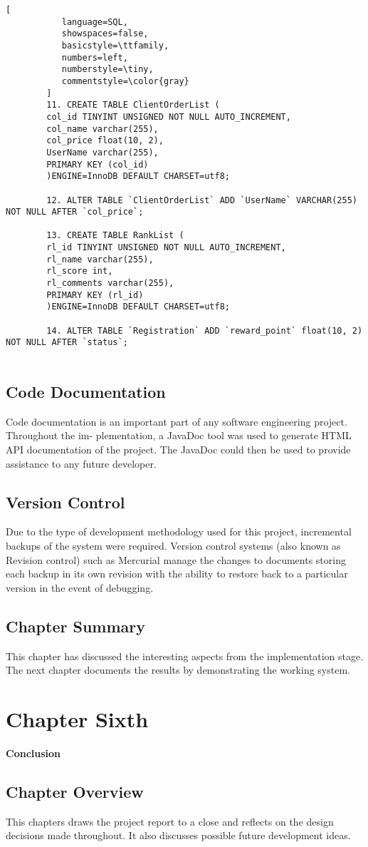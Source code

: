 \documentclass[12pt,a4paper]{article}
\begin{document}
\begin{lstlisting}[
           language=SQL,
           showspaces=false,
           basicstyle=\ttfamily,
           numbers=left,
           numberstyle=\tiny,
           commentstyle=\color{gray}
        ]
	 	11. CREATE TABLE ClientOrderList (
		col_id TINYINT UNSIGNED NOT NULL AUTO_INCREMENT,
		col_name varchar(255),
		col_price float(10, 2),
		UserName varchar(255),
		PRIMARY KEY (col_id)
		)ENGINE=InnoDB DEFAULT CHARSET=utf8;

	 	12. ALTER TABLE `ClientOrderList` ADD `UserName` VARCHAR(255) NOT NULL AFTER `col_price`;

	 	13. CREATE TABLE RankList (
		rl_id TINYINT UNSIGNED NOT NULL AUTO_INCREMENT,
		rl_name varchar(255),
		rl_score int,
		rl_comments varchar(255),
		PRIMARY KEY (rl_id)
		)ENGINE=InnoDB DEFAULT CHARSET=utf8;
		
	 	14. ALTER TABLE `Registration` ADD `reward_point` float(10, 2) NOT NULL AFTER `status`;
		
\end{lstlisting}
	
	\subsection{Code Documentation}
	Code documentation is an important part of any software engineering project. Throughout the im-
plementation, a JavaDoc tool was used to generate HTML API documentation of the project. The
JavaDoc could then be used to provide assistance to any future developer.

	\subsection{Version Control}
	Due to the type of development methodology used for this project, incremental backups of the system
were required. Version control systems (also known as Revision control) such as Mercurial manage
the changes to documents storing each backup in its own revision with the ability to restore back to a
particular version in the event of debugging.	

	\subsection{Chapter Summary}
	This chapter has discussed the interesting aspects from the implementation stage. The next chapter
documents the results by demonstrating the working system.
	
	\newpage	
	\section{Chapter Sixth}
	{\bfseries \Large Conclusion}
	\subsection{Chapter Overview}
		This chapters draws the project report to a close and reflects on the design decisions made throughout.
It also discusses possible future development ideas.
\end{document}
